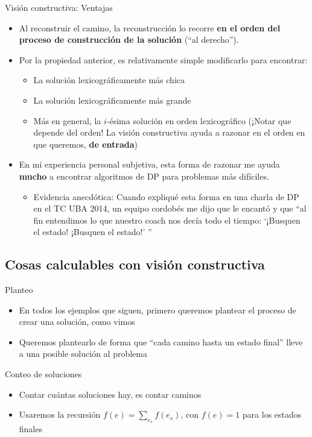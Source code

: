\documentclass{beamer}
\begin{document}
\begin{frame}{Visión constructiva: Ventajas}
	\begin{itemize}
		\item Al reconstruir el camino, la reconstrucción lo recorre \textbf{en el orden del proceso de construcción de la solución} (``al derecho'').
		\item Por la propiedad anterior, es relativamente simple modificarlo para encontrar:
			\begin{itemize}
				\item La solución lexicográficamente más chica
				\item La solución lexicográficamente más grande
				\item Más en general, la $i$-ésima solución en orden lexicográfico (¡Notar que depende del orden! La visión constructiva ayuda a razonar en el orden en que queremos, \textbf{de entrada})
			\end{itemize}
		\item En mi experiencia personal subjetiva, esta forma de razonar me ayuda \textbf{mucho} a encontrar algoritmos de DP para problemas más difíciles.
		   \begin{itemize}
			\item Evidencia anecdótica: Cuando expliqué esta forma en una charla de DP en el TC UBA 2014, un equipo cordobés me dijo que le encantó y que ``al fin entendimos lo que nuestro coach nos decía todo el tiempo: `¡Busquen el estado! ¡Busquen el estado!' ''
		   \end{itemize}
	\end{itemize}
\end{frame}

\subsection{Cosas calculables con visión constructiva}

\begin{frame}{Planteo}
	\begin{itemize}
		\item En todos los ejemplos que siguen, primero queremos plantear el proceso de crear una solución, como vimos
		\item Queremos plantearlo de forma que ``cada camino hasta un estado final'' lleve a una posible solución al problema
	\end{itemize}
\end{frame}

\begin{frame}{Conteo de soluciones}
	\begin{itemize}
		\item Contar cuántas soluciones hay, es contar caminos
		\item Usaremos la recursión $f(e) = \sum_{e_s}{f(e_s)}$, con $f(e) = 1$ para los estados finales
	\end{itemize}
\end{frame}
\end{document}
